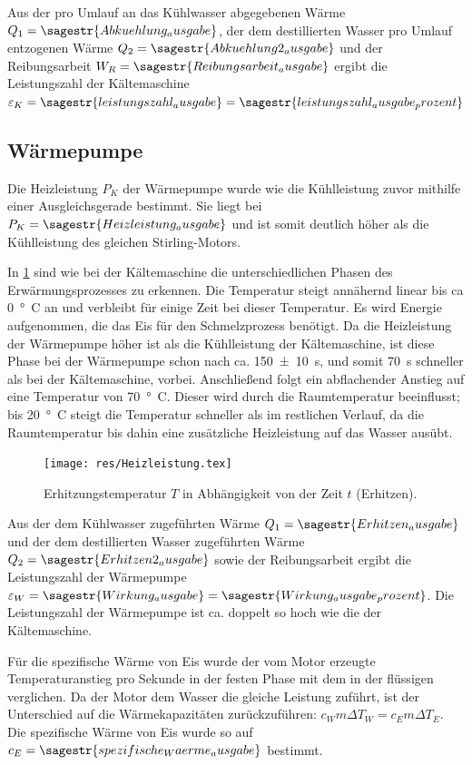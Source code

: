 Aus der pro Umlauf an das Kühlwasser abgegebenen Wärme $Q_1 = \sagestr{Abkuehlung_ausgabe}$, der dem destillierten Wasser pro Umlauf entzogenen Wärme $Q_2 = \sagestr{Abkuehlung2_ausgabe}$ und der Reibungsarbeit $W_R = \sagestr{Reibungsarbeit_ausgabe}$
ergibt die Leistungszahl der Kältemaschine $\epsilon_K = \sagestr{leistungszahl_ausgabe} = \sagestr{leistungszahl_ausgabe_prozent}$


\subsection{Wärmepumpe}
Die Heizleistung $P_K$ der Wärmepumpe wurde wie die Kühlleistung zuvor mithilfe einer Ausgleichsgerade bestimmt. Sie liegt bei $P_K = 
\sagestr{Heizleistung_ausgabe}$ und ist somit deutlich höher als die Kühlleistung des gleichen Stirling-Motors. 

In \cref{Heizleistung} sind wie bei der Kältemaschine die unterschiedlichen Phasen des Erwärmungsprozesses zu erkennen. Die Temperatur steigt annähernd linear bis ca \SI{0}{°C} an und verbleibt für einige Zeit bei dieser Temperatur. Es wird Energie aufgenommen, die das Eis für den Schmelzprozess benötigt. Da die Heizleistung der Wärmepumpe höher ist als die Kühlleistung der Kältemaschine, ist diese Phase bei der Wärmepumpe schon nach ca. \SI{150+-10}{s}, und somit \SI{70}{s} schneller als bei der Kältemaschine, vorbei. Anschließend folgt ein abflachender Anstieg auf eine Temperatur von \SI{70}{°C}. Dieser wird durch die Raumtemperatur beeinflusst; bis \SI{20}{°C} steigt die Temperatur schneller als im restlichen Verlauf, da die Raumtemperatur bis dahin eine zusätzliche Heizleistung auf das Wasser ausübt.

\begin{figure}
	\centering
	\texttt{[image: res/Heizleistung.tex]}
	\caption{Erhitzungstemperatur $T$ in Abhängigkeit von der Zeit $t$ (Erhitzen). \label{Heizleistung}}
\end{figure}


Aus der dem Kühlwasser zugeführten Wärme $Q_1 = \sagestr{Erhitzen_ausgabe}$ und der dem destillierten Wasser zugeführten Wärme $Q_2 = \sagestr{Erhitzen2_ausgabe}$ sowie der Reibungsarbeit ergibt die Leistungszahl der Wärmepumpe $\epsilon_W =  \sagestr{Wirkung_ausgabe} = \sagestr{Wirkung_ausgabe_prozent}$. Die Leistungszahl der Wärmepumpe ist ca. doppelt so hoch wie die der Kältemaschine.

Für die spezifische Wärme von Eis wurde der vom Motor erzeugte Temperaturanstieg pro Sekunde in der festen Phase mit dem in der flüssigen verglichen. Da der Motor dem Wasser die gleiche Leistung zuführt, ist der Unterschied auf die Wärmekapazitäten zurückzuführen: $c_W m \Delta T_W = c_E m \Delta T_E$. Die spezifische Wärme von Eis wurde so auf $c_E = \sagestr{spezifische_Waerme_ausgabe}$ bestimmt.


